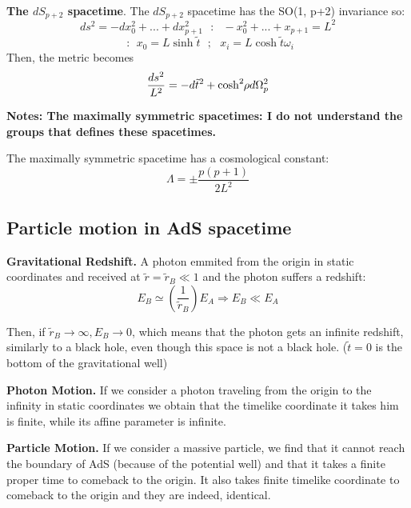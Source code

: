 \documentclass[12pt]{article}
\begin{document}
\newpage

\textbf{The \(dS_{p+2}\) spacetime}. The \(dS_{p+2}\) spacetime has the SO(1, p+2) invariance so:
\begin{equation}
    ds^2 = - dx_0^2 + ... + dx_{p+1}^2 ~~~:~~~ - x_0^2 + ... + x_{p+1} = L^2
\end{equation}
\begin{equation}
    ~~:~~ x_0 = L\sinh{ \tilde{t} } ~~~;~~~ x_i = L\cosh{ \tilde{t} } \omega_i
\end{equation}
Then, the metric becomes
\begin{equation}
    \frac{ds^2}{L^2} = -d\tilde{t}^2 + \cosh^2{ \hspace{-2pt}\rho }d\Omega_p^2
\end{equation}

\textbf{Notes: The maximally symmetric spacetimes: I do not understand the groups that defines these spacetimes.}

The maximally symmetric spacetime has a cosmological constant:
\[
    \Lambda = \pm\frac{p(p+1)}{2L^2}
\]

\subsection{Particle motion in AdS spacetime}

\textbf{Gravitational Redshift.} A photon emmited from the origin in static coordinates and received at \(\tilde{r} = \tilde{r}_B \ll 1\) and the photon suffers a redshift:
\begin{equation}
    E_B \simeq \left(\frac{1}{\tilde{r}_B}\right)E_A \Longrightarrow E_B \ll E_A
\end{equation}

Then, if \( \tilde{r}_B \rightarrow \infty, E_B \rightarrow 0 \), which means that the photon gets an infinite redshift, similarly to a black hole, even though this space is not a black hole. (\( \tilde{t} = 0\) is the bottom of the gravitational well)

\textbf{Photon Motion.} If we consider a photon traveling from the origin to the infinity in static coordinates we obtain that the timelike coordinate it takes him is finite, while its affine parameter is infinite.

\textbf{Particle Motion.} If we consider a massive particle, we find that it cannot reach the boundary of AdS (because of the potential well) and that it takes a finite proper time to comeback to the origin. It also takes finite timelike coordinate to comeback to the origin and they are indeed, identical. 
\end{document}
